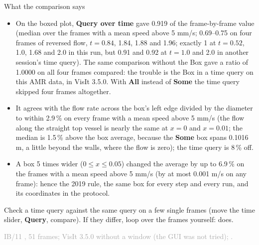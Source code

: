 \documentclass[aspectratio=169,11pt]{beamer}
\newcommand{\sourcecredit}[1]{\vfill\begin{flushright}\tiny\textcolor{DarkGray}{#1}\end{flushright}}
\newcommand{\gui}[1]{\textsf{\textbf{#1}}}
\begin{document}
\begin{frame}{What the comparison says}
\label{fr:compare2}
\footnotesize
\begin{itemize}
  \item {} On the boxed plot, \gui{Query over time} gave 0.919 of the frame-by-frame value (median over the frames with a mean speed above 5 mm/s; 0.69--0.75 on four frames of reversed flow, $t = 0.84$, 1.84, 1.88 and 1.96; exactly 1 at $t = 0.52$, 1.0, 1.68 and 2.0 in this run, but 0.91 and 0.92 at $t = 1.0$ and 2.0 in another session's time query). The same comparison without the Box gave a ratio of 1.0000 on all four frames compared: the trouble is the Box in a time query on this AMR data, in VisIt 3.5.0. With \gui{All} instead of \gui{Some} the time query skipped four frames altogether.
  \item {} It agrees with the flow rate across the box's left edge divided by the diameter to within 2.9\,\% on every frame with a mean speed above 5 mm/s (the flow along the straight top vessel is nearly the same at $x = 0$ and $x = 0.01$; the median is 1.5\,\% above the box average, because the \gui{Some} box spans 0.1016 m, a little beyond the walls, where the flow is zero); the time query is 8\,\% off.
  \item {} A box 5 times wider ($0 \le x \le 0.05$) changed the average by up to 6.9\,\% on the frames with a mean speed above 5 mm/s (by at most 0.001 m/s on any frame): hence the 2019 rule, the same box for every step and every run, and its coordinates in the protocol.
\end{itemize}
\begin{punchbox}
\small Check a time query against the same query on a few single frames (move the time slider, \gui{Query}, compare). If they differ, loop over the frames yourself:  does.
\end{punchbox}
\sourcecredit{IB/11 , 51 frames; VisIt 3.5.0 without a window (the GUI was not tried); \code{wsl/final/visit\_ch29\_avg*.sh}.}
\end{frame}
\end{document}
